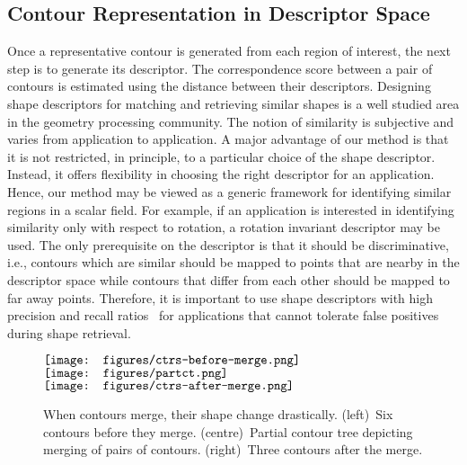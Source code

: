 \documentclass[review,journal]{vgtc}         %
\begin{document}
\subsection{Contour Representation in Descriptor Space}
Once a representative contour is generated from each region of interest, the next step
is to generate its descriptor. The correspondence score between a pair of
contours is estimated using the distance between their descriptors.
Designing shape descriptors for matching and retrieving similar shapes is a well studied 
area in the geometry processing community. 
The notion of similarity is subjective and varies from application to application.
A major advantage of our method is that it is not restricted, in principle, to a particular choice
of the shape descriptor. Instead, it offers flexibility in choosing 
the right descriptor for an application.  Hence, our method may be viewed as a generic framework for identifying
similar regions in a scalar field. For example, if an application is interested in 
identifying similarity only with respect to rotation, a rotation invariant descriptor may be used. 
The only prerequisite on the descriptor is that it should be discriminative, i.e., contours which are 
similar should be mapped to points that are nearby in the descriptor space while contours that differ 
from each other should be mapped to far away points. Therefore, it is important to use shape descriptors 
with high precision and recall ratios~\cite{lian2013} for applications that cannot tolerate false 
positives during shape retrieval.
\begin{figure}[b]
	\begin{minipage}{\linewidth}
	\centering
	{
			$\vcenter{\hbox{\texttt{[image: figures/ctrs-before-merge.png]}}}$
	}
	\hspace{0.3cm}
	{
			$\vcenter{\hbox{\texttt{[image: figures/partct.png]}}}$
	}
	\hspace{0.3cm}
	{
			$\vcenter{\hbox{\texttt{[image: figures/ctrs-after-merge.png]}}}$
	}
	\caption{\label{ct-merge}When contours merge, their shape change drastically. 
		(left)~Six contours before they merge. (centre)~Partial contour tree depicting
	merging of pairs of contours. (right)~Three contours after the merge.}
\end{minipage}
\end{figure}
\end{document}
